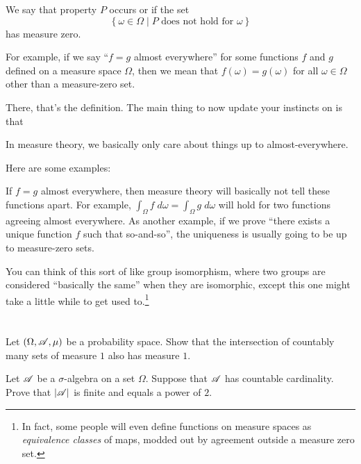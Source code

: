 \begin{definition}
	We say that property $P$ occurs
	 or  if the set
	\[ \left\{ \omega \in \Omega \mid \text{$P$ does not hold for $\omega$} \right\} \]
	has measure zero.
\end{definition}

For example, if we say ``$f = g$ almost everywhere''
for some functions $f$ and $g$ defined on a measure space $\Omega$,
then we mean that $f(\omega) = g(\omega)$ for all $\omega \in \Omega$
other than a measure-zero set.

There, that's the definition.
The main thing to now update your instincts on is that
\begin{moral}
	In measure theory,
	we basically only care about things up to almost-everywhere.
\end{moral}
Here are some examples:
\begin{itemize}
	\ii If $f=g$ almost everywhere,
	then measure theory will basically not tell these functions apart.
	For example, $\int_\Omega f \; d\omega = \int_\Omega g \; d\omega$
	will hold for two functions agreeing almost everywhere.
	\ii As another example,
	if we prove ``there exists a unique function $f$ such that so-and-so'',
	the uniqueness is usually going to be up to measure-zero sets.
\end{itemize}
You can think of this sort of like group isomorphism,
where two groups are considered ``basically the same'' when they are isomorphic,
except this one might take a little while to get used to.\footnote{In fact,
	some people will even define functions on measure spaces
	as \emph{equivalence classes} of maps,
	modded out by agreement outside a measure zero set.}

\section{\problemhead}
\begin{dproblem}
	Let $(\Omega, \mathscr A, \mu)$ be a probability space.
	Show that the intersection of countably many sets of measure $1$
	also has measure $1$.
\end{dproblem}

\begin{problem}
	\onechili
	Let $\mathscr A$ be a $\sigma$-algebra on a set $\Omega$.
	Suppose that $\mathscr A$ has countable cardinality.
	Prove that $|\mathscr A|$ is finite and equals a power of $2$.
\end{problem}
